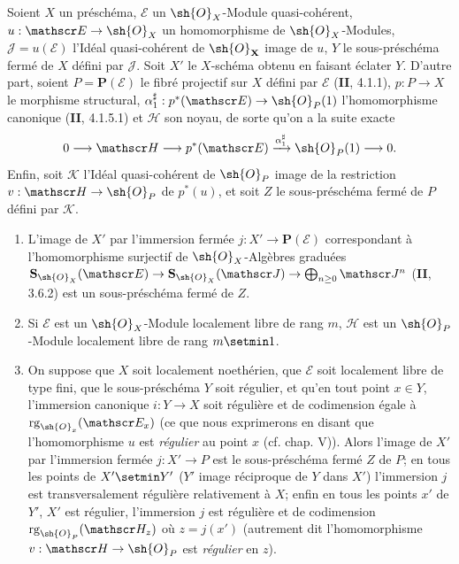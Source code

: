 \begin{proposition}[19.4.11]
Soient $X$ un préschéma, $\mathscr E$ un $\sh{O}_X$-Module quasi-cohérent, $u:\mathscr E\to\sh{O}_X$ un homomorphisme de $\sh{O}_X$-Modules, $\mathscr J=u(\mathscr E)$ l'Idéal quasi-cohérent de $\sh{O}_{\mathbf X}$ image de $u$, $Y$ le sous-préschéma fermé de $X$ défini par $\mathscr J$. Soit $X'$ le $X$-schéma obtenu en faisant éclater $Y$. D'autre part, soient $P=\mathbf P(\mathscr E)$ le fibré projectif sur $X$ défini par $\mathscr E$ \textup{(\textbf{II}, 4.1.1)}, $p:P\to X$ le morphisme structural, $\alpha_1^{\sharp}:p^*(\mathscr E)\to\sh{O}_P(1)$ l'homomorphisme canonique \textup{(\textbf{II}, 4.1.5.1)} et $\mathscr H$ son noyau, de sorte qu'on a la suite exacte
\[
  0\longrightarrow\mathscr H\longrightarrow p^*(\mathscr E)\xrightarrow{\alpha_1^{\sharp}}\sh{O}_P(1)\longrightarrow0.
\]
Enfin, soit $\mathscr K$ l'Idéal quasi-cohérent de $\sh{O}_P$ image de la restriction $v:\mathscr H\to\sh{O}_P$ de $p^*(u)$, et soit $Z$ le sous-préschéma fermé de $P$ défini par $\mathscr K$.


\begin{enumerate}
  \item[\textup{(i)}] L'image de $X'$ par l'immersion fermée $j:X'\to\mathbf P(\mathscr E)$ correspondant à l'homomorphisme surjectif de $\sh{O}_X$-Algèbres graduées $\mathbf S_{\sh{O}_X}(\mathscr E)\to\mathbf S_{\sh{O}_X}(\mathscr J)\to\bigoplus_{n\geq0}\mathscr J^n$ \textup{(\textbf{II}, 3.6.2)} est un sous-préschéma fermé de $Z$.
  \item[\textup{(ii)}] Si $\mathscr E$ est un $\sh{O}_X$-Module localement libre de rang $m$, $\mathscr H$ est un $\sh{O}_P$-Module localement libre de rang $m\setmin 1$.
  \item[\textup{(iii)}] On suppose que $X$ soit localement noethérien, que $\mathscr E$ soit localement libre de type fini, que le sous-préschéma $Y$ soit régulier, et qu'en tout point $x\in Y$, l'immersion canonique $i:Y\to X$ soit régulière et de codimension égale à $\operatorname{rg}_{\sh{O}_x}(\mathscr E_x)$ \textup{(ce que nous exprimerons en disant que l'homomorphisme $u$ est \emph{régulier} au point $x$ (cf. chap. V))}. Alors l'image de $X'$ par l'immersion fermée $j:X'\to P$ est le sous-préschéma fermé $Z$ de $P$; en tous les points de $X'\setmin Y'$ \textup{(}$Y'$ image réciproque de $Y$ dans $X'$\textup{)} l'immersion $j$ est transversalement régulière relativement à $X$; enfin en tous les points $x'$ de $Y'$, $X'$ est régulier, l'immersion $j$ est régulière et de codimension $\operatorname{rg}_{\sh{O}_P}(\mathscr H_z)$ où $z=j(x')$ \textup{(autrement dit l'homomorphisme $v:\mathscr H\to\sh{O}_P$ est \emph{régulier} en $z$)}.
\end{enumerate}
\end{proposition}

